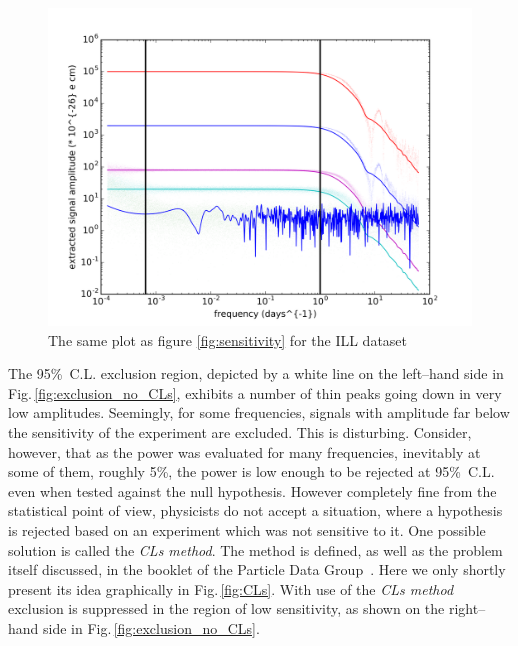\begin{figure}[htb]
  \centering \includegraphics[width=\linewidth]{gfx/axions/ILL_signal_response_plot.png}
  \caption{The same plot as figure \ref{fig:sensitivity} for the ILL dataset}
  \label{fig:ILL_sensitivity}
\end{figure}


The 95\%~C.L. exclusion region, depicted by a white line on the left--hand side in Fig.\,\ref{fig:exclusion_no_CLs}, exhibits a number of thin peaks going down in very low amplitudes. Seemingly, for some frequencies, signals with amplitude far below the sensitivity of the experiment are excluded. This is disturbing. Consider, however, that as the power was evaluated for many frequencies, inevitably at some of them, roughly 5\%, the power is low enough to be rejected at 95\%~C.L. even when tested against the null hypothesis. However completely fine from the statistical point of view, physicists do not accept a situation, where a hypothesis is rejected based on an experiment which was not sensitive to it. One possible solution is called the \emph{CLs method}. The method is defined, as well as the problem itself discussed, in the booklet of the Particle Data Group~\citep{PDG2014}. Here we only shortly present its idea graphically in Fig.\,\ref{fig:CLs}. With use of the \emph{CLs method} exclusion is suppressed in the region of low sensitivity, as shown on the right--hand side in Fig.\,\ref{fig:exclusion_no_CLs}.


